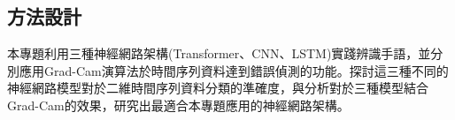 \documentclass[12pt,a4paper]{report}
\begin{document}
\begin{CJK*}{UTF8}{bkai}
    \section{方法設計}
    \par
    本專題利用三種神經網路架構(Transformer、CNN、LSTM)實踐辨識手語，並分別應用Grad-Cam演算法於時間序列資料達到錯誤偵測的功能。探討這三種不同的神經網路模型對於二維時間序列資料分類的準確度，與分析對於三種模型結合Grad-Cam的效果，研究出最適合本專題應用的神經網路架構。





\end{CJK*}
\end{document}
